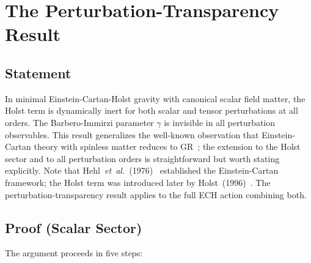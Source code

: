 \documentclass[aps,prd,twocolumn,superscriptaddress,showpacs,preprintnumbers,nofootinbib,longbibliography,floatfix]{revtex4-2}
\newcommand{\etal}{\textit{et~al.}}
\begin{document}
\section{The Perturbation-Transparency Result}\label{sec:transparency}

\subsection{Statement}

In minimal Einstein-Cartan-Holst gravity with canonical scalar field matter, the Holst term is dynamically inert for both scalar and tensor perturbations at all orders. The Barbero-Immirzi parameter $\gamma$ is invisible in all perturbation observables. This result generalizes the well-known observation that Einstein-Cartan theory with spinless matter reduces to GR~\cite{Hehl1976}; the extension to the Holst sector and to all perturbation orders is straightforward but worth stating explicitly. Note that Hehl~\etal~(1976)~\cite{Hehl1976} established the Einstein-Cartan framework; the Holst term was introduced later by Holst~(1996)~\cite{Holst1996}. The perturbation-transparency result applies to the full ECH action combining both.

\subsection{Proof (Scalar Sector)}

The argument proceeds in five steps:
\end{document}
